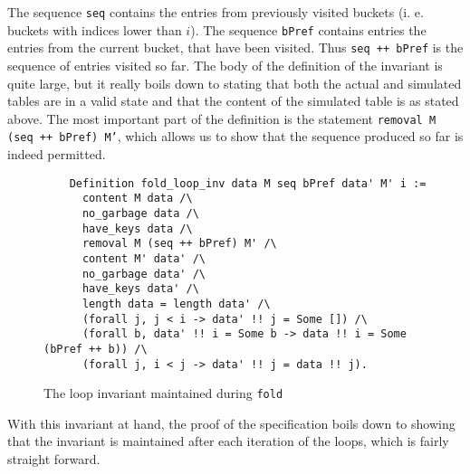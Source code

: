 \documentclass[10pt,a4paper]{article}
\begin{document}
The sequence \texttt{seq} contains the entries from previously visited buckets (i. e. buckets with indices lower than $i$). The sequence \texttt{bPref} contains entries the entries from the current bucket, that have been visited. Thus \texttt{seq ++ bPref} is the sequence of entries visited so far. The body of the definition of the invariant is quite large, but it really boils down to stating that both the actual and simulated tables are in a valid state and that the content of the simulated table is as stated above. The most important part of the definition is the statement \texttt{removal M (seq ++ bPref) M'}, which allows us to show that the sequence produced so far is indeed permitted.

\begin{figure}
\begin{verbatim}
    Definition fold_loop_inv data M seq bPref data' M' i :=
      content M data /\
      no_garbage data /\
      have_keys data /\
      removal M (seq ++ bPref) M' /\
      content M' data' /\
      no_garbage data' /\
      have_keys data' /\
      length data = length data' /\
      (forall j, j < i -> data' !! j = Some []) /\
      (forall b, data' !! i = Some b -> data !! i = Some (bPref ++ b)) /\
      (forall j, i < j -> data' !! j = data !! j).
\end{verbatim}
\caption{The loop invariant maintained during \texttt{fold}}
\label{fig:loop_inv}   
\end{figure}

With this invariant at hand, the proof of the specification boils down to showing that the invariant is maintained after each iteration of the loops, which is fairly straight forward.
\end{document}
